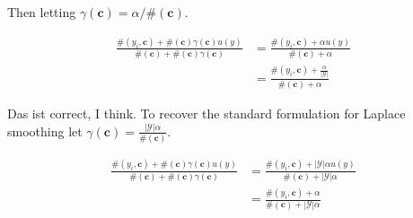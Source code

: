 \documentclass{article}
\newcommand{\context}{\boldsymbol{c}}
\begin{document}
			Then letting $\gamma(\context) = \alpha/\#(\context)$.
		
			\begin{align}
				\frac{\#(y_i, \context) +\#(\context)\gamma(\context)u(y)}{ \#(\context) + \#(\context)\gamma(\context)}	&= \frac{\#(y_i, \context) +\alpha u(y)}{ \#(\context) + \alpha}\\
				&= \frac{\#(y_i, \context) + \frac{\alpha}{|\mathcal{Y}|}}{ \#(\context) + \alpha}
			\end{align}
		
			Das ist correct, I think. To recover the standard formulation for Laplace smoothing let $\gamma(\context) = \frac{|\mathcal{Y}|\alpha}{\#(\context)}$.
		
			\begin{align}
				\frac{\#(y_i, \context) +\#(\context)\gamma(\context)u(y)}{ \#(\context) + \#(\context)\gamma(\context)}	&= \frac{\#(y_i, \context) +|\mathcal{Y}|\alpha u(y)}{ \#(\context) + |\mathcal{Y}|\alpha}\\
				&= \frac{\#(y_i, \context) + \alpha}{ \#(\context) + |\mathcal{Y}|\alpha}
			\end{align}
		
		
		
		
		
		
		
		
		
		
		
		
		
		
		
		
\end{document}
